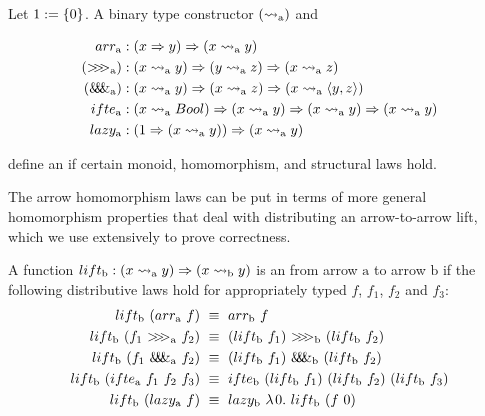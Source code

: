 \begin{definition}[arrow]Let $1 := \{{0}\}$. A binary type constructor $(\rightsquigarrow_\mathrm{a})$ and
\begin{displaybreaks}
\begin{equation}
\begin{aligned}
	arr_\mathrm{a} &: (x \Rightarrow y) \Rightarrow (x \rightsquigarrow_\mathrm{a} y)
\nobreak\\
	({>}\mspace{-6mu}{>}\mspace{-6mu}{>}_\mathrm{a}) &: (x \rightsquigarrow_\mathrm{a} y) \Rightarrow (y \rightsquigarrow_\mathrm{a} z) \Rightarrow (x \rightsquigarrow_\mathrm{a} z)
\\
	(\mathit{\&\mspace{-7.5mu}\&\mspace{-7.5mu}\&}_\mathrm{a}) &: (x \rightsquigarrow_\mathrm{a} y) \Rightarrow (x \rightsquigarrow_\mathrm{a} z) \Rightarrow (x \rightsquigarrow_\mathrm{a} \langle{y,z}\rangle)
\\
	ifte_\mathrm{a} &: (x \rightsquigarrow_\mathrm{a} Bool) \Rightarrow (x \rightsquigarrow_\mathrm{a} y) \Rightarrow (x \rightsquigarrow_\mathrm{a} y) \Rightarrow (x \rightsquigarrow_\mathrm{a} y)
\nobreak\\
	lazy_\mathrm{a} &: (1 \Rightarrow (x \rightsquigarrow_\mathrm{a} y)) \Rightarrow (x \rightsquigarrow_\mathrm{a} y)
\label{eqn:arrow-combinators}
\end{aligned}
\end{equation}
\end{displaybreaks}
define an  if certain monoid, homomorphism, and structural laws hold.
\end{definition}

The arrow homomorphism laws can be put in terms of more general homomorphism properties that deal with distributing an arrow-to-arrow lift, which we use extensively to prove correctness.

\begin{definition}
\label{def:arrow-homomorphism}
A function $lift_\mathrm{b} : (x \rightsquigarrow_\mathrm{a} y) \Rightarrow (x \rightsquigarrow_\mathrm{b} y)$ is an  from arrow $\mathrm{a}$ to arrow $\mathrm{b}$ if the following distributive laws hold for appropriately typed $f$, $f_1$, $f_2$ and $f_3$:
\begin{align}
	lift\genb~(\arrowarr\gen~f) &\ \equiv \ \arrowarr\genb~f
	\label{eqn:lift-distributes-over-arr}
\\
	lift\genb~(f_1~\arrowcomp\gen~f_2) &\ \equiv \ (lift\genb~f_1)~\arrowcomp\genb~(lift\genb~f_2)
	\label{eqn:lift-distributes-over-comp}
\\
	lift\genb~(f_1~\arrowpair\gen~f_2) &\ \equiv \ (lift\genb~f_1)~\arrowpair\genb~(lift\genb~f_2)
	\label{eqn:lift-distributes-over-pair}
\\
	\arrowlift\genb~(\arrowif\gen~f_1~f_2~f_3) &\ \equiv \ 
		\arrowif\genb~(lift\genb~f_1)~(lift\genb~f_2)~(lift\genb~f_3)
	\label{eqn:lift-distributes-over-if}
\\
	\arrowlift\genb~(\arrowlazy\gen~f) &\ \equiv \
		\arrowlazy\genb~\fun{0}{\arrowlift\genb~(f~0)}
	\label{eqn:lift-distributes-over-lazy}
\end{align}
\end{definition}

